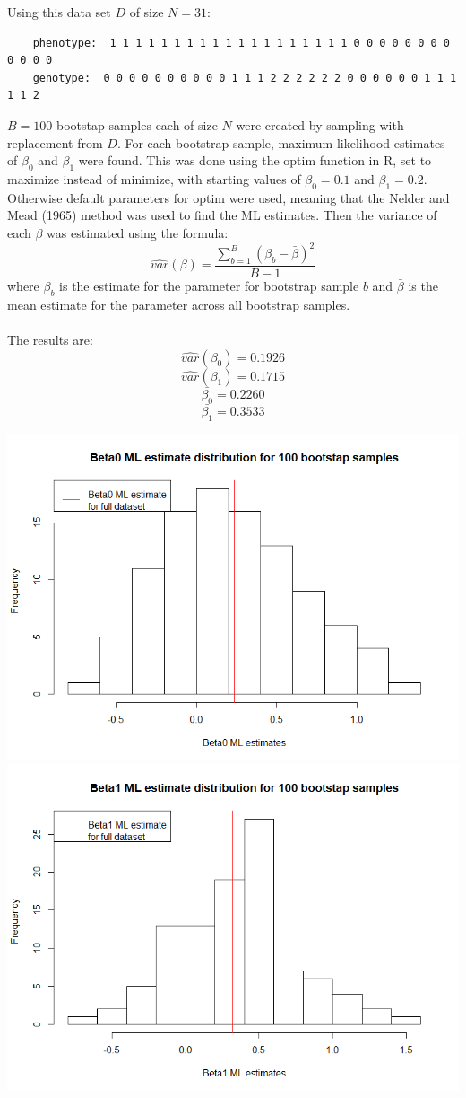 \documentclass{article}
\begin{document}
	Using this data set $D$ of size $N = 31$:
	\begin{verbatim}
	phenotype:	1 1 1 1 1 1 1 1 1 1 1 1 1 1 1 1 1 1 1 0 0 0 0 0 0 0 0 0 0 0 0
	genotype:  0 0 0 0 0 0 0 0 0 0 1 1 1 2 2 2 2 2 2 0 0 0 0 0 0 1 1 1 1 1 2
	\end{verbatim}	
	$B = 100$ bootstap samples each of size $N$ were created by sampling with replacement from $D$. For each bootstrap sample, maximum likelihood estimates of $\beta_0$ and $\beta_1$ were found. This was done using the optim function in R, set to maximize instead of minimize, with starting values of $\beta_0 = 0.1$ and $\beta_1 = 0.2$. Otherwise default parameters for optim were used, meaning that the Nelder and Mead (1965) method was used to find the ML estimates. Then the variance of each $\beta$ was estimated using the formula:
	\[\hat{var}(\beta) = \frac{\sum^{B}_{b=1}(\beta_b - \bar{\beta})^2}{B - 1}\] 
	where $\beta_b$ is the estimate for the parameter for bootstrap sample $b$ and $\bar{\beta}$ is the mean estimate for the parameter across all bootstrap samples.
	
	\paragraph{}The results are:
	\[\hat{var}(\beta_0) = 0.1926\]
	\[\hat{var}(\beta_1) = 0.1715\]
	\[\bar{\beta_0} = 0.2260\]
	\[\bar{\beta_1} = 0.3533\]
	
	\includegraphics[scale=0.53]{Beta0}\\
	\includegraphics[scale=0.53]{Beta1}\\
	
	\paragraph{} 
	
	
\end{document}
